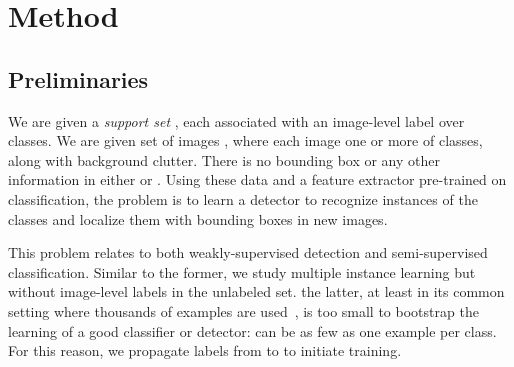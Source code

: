 \documentclass[review]{elsarticle}
\begin{document}
\subsection{}

 \section{Method}
\label{sec:method}

\subsection{Preliminaries}

We are given a \emph{support set}  , each associated with an image-level label over  classes. 
We are  given  set of images , where each image  one or more 
of   classes, along with background clutter.
There is no bounding box or any other information in either  or .
Using these data and a {feature extractor  pre-trained on classification},
the problem is to learn a detector
to recognize instances of the  classes and localize them with bounding boxes in new images.






This problem relates to both weakly-supervised detection and semi-supervised classification.
Similar to the former, we study multiple instance learning but without image-level labels in the unlabeled set. 
the latter, at least in its common setting where thousands of examples are used~\cite{RBH+15,LA17}, 
 is too small to bootstrap the learning of a good classifier or detector:
 can be as few as one example per class. For this reason, we
propagate labels from  to  to initiate training.
\end{document}

